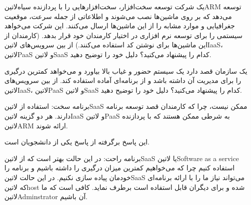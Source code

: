 

یک شرکت توسعه سخت‌افزار، سخت‌افزارهایی را با پردازنده ‌سیاه{‌لاتین{ARM}} توسعه می‌دهد که بر روی ماشین‌ها نصب می‌شوند
و اطلاعاتی از جمله سرعت، موقعیت جغرافیایی و موارد مشابه را از این ماشین‌ها ارسال می‌کنند. این شرکت می‌خواهد سیستمی را برای توسعه نرم افزاری در اختیار کارمندان خود قرار بدهد.
(کارمندان از این ماشین‌ها برای نوشتن کد استفاده می‌کنند.)
از بین سرویس‌های ‌لاتین{IaaS}، ‌لاتین{PaaS} و ‌لاتین{SaaS} کدام را پیشنهاد می‌کنید؟ دلیل خود را توضیح دهید.


یک سازمان قصد دارد یک سیستم حضور و غیاب بالا بیاورد و می‌خواهد کمترین درگیری را برای مدیریت آن داشته باشد و از برنامه‌ای آماده استفاده کند.
از بین سرویس‌های ‌لاتین{IaaS}، ‌لاتین{PaaS} و ‌لاتین{SaaS} کدام را پیشنهاد می‌کنید؟ دلیل خود را توضیح دهید.


\begin{پاسخ}

برنامه سخت: استفاده از ‌لاتین{SaaS} ممکن نیست، چرا که کارمندان قصد توسعه برنامه دارند.
هر دو گزینه ‌لاتین{IaaS} و ‌لاتین{PaaS} به شرطی ممکن هستند که با پردازنده ‌لاتین{ARM} ارائه شوند.


این پاسخ برگرفته از پاسخ یکی از دانشجویان است.

برنامه راحت: در این حالت بهتر است که از ‌لاتین{SaaS} یا ‌لاتین{Software as a service} استفاده کنیم چرا که می‌خواهیم
کمترین میزان درگیری را داشته باشیم و برنامه را خودمان پیاده سازی نکنیم.
در این حالت ‌لاتین{SaaS} می‌تواند نیاز ما را با ارائه برنامه‌ای که
‌لاتین{host} شده و برای دیگران قابل استفاده است برطرف نماید. کافی است که ما ‌لاتین{Adminstrator} آن
باشیم.

\end{پاسخ}
